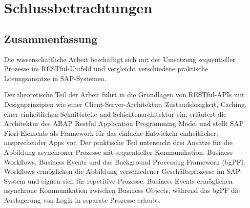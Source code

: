 \chapter{Schlussbetrachtungen}


\section{Zusammenfassung}

Die wissenschaftliche Arbeit beschäftigt sich mit der Umsetzung sequentieller Prozesse im RESTful-Umfeld und vergleicht verschiedene praktische Lösungsansätze in SAP-Systemen. 

Der theoretische Teil der Arbeit führt in die Grundlagen von RESTful-APIs mit Designprinzipien wie einer Client-Server-Architektur, Zustandslosigkeit, Caching, einer einheitlichen Schnittstelle und Schichtenarchitektur ein, erläutert die Architektur des ABAP Restful Application Programming Model und stellt SAP Fiori Elements als Framework für das einfache Entwickeln einheitlicher, ansprechender Apps vor. \newline
Der praktische Teil untersucht drei Ansätze für die Abbildung asynchroner Prozesse mit sequentieller Kommunikation: Business Workflows, Business Events und das Background Processing Framework (bgPF). Workflows ermöglichen die Abbildung verschiedener Geschäftsprozesse im SAP-System und eignen sich für repetitive Prozesse. Business Events ermöglichen asynchrone Kommunikation zwischen Business Objects, während das bgPF die Auslagerung von Logik in separate Prozesse erlaubt.

